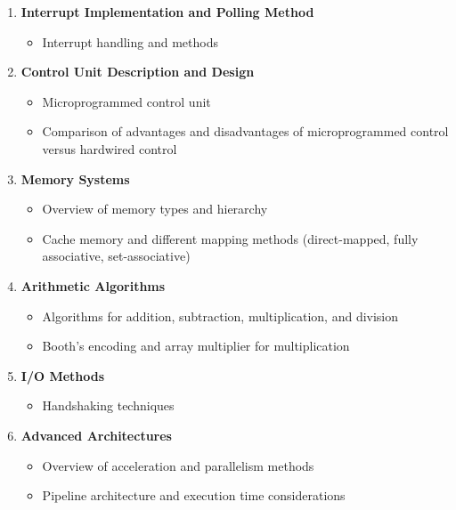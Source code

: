 \documentclass[12pt]{article}
\begin{document}
\begin{enumerate}
    \item \textbf{Interrupt Implementation and Polling Method}
        \begin{itemize}
            \item Interrupt handling and methods
        \end{itemize}
    
    \item \textbf{Control Unit Description and Design}
        \begin{itemize}
            \item Microprogrammed control unit
            \item Comparison of advantages and disadvantages of microprogrammed control versus hardwired control
        \end{itemize}
    
    \item \textbf{Memory Systems}
        \begin{itemize}
            \item Overview of memory types and hierarchy
            \item Cache memory and different mapping methods (direct-mapped, fully associative, set-associative)
        \end{itemize}
    
    \item \textbf{Arithmetic Algorithms}
        \begin{itemize}
            \item Algorithms for addition, subtraction, multiplication, and division
            \item Booth's encoding and array multiplier for multiplication
        \end{itemize}
    
    \item \textbf{I/O Methods}
        \begin{itemize}
            \item Handshaking techniques
        \end{itemize}
    
    \item \textbf{Advanced Architectures}
        \begin{itemize}
            \item Overview of acceleration and parallelism methods
            \item Pipeline architecture and execution time considerations
        \end{itemize}
\end{enumerate}
\end{document}
